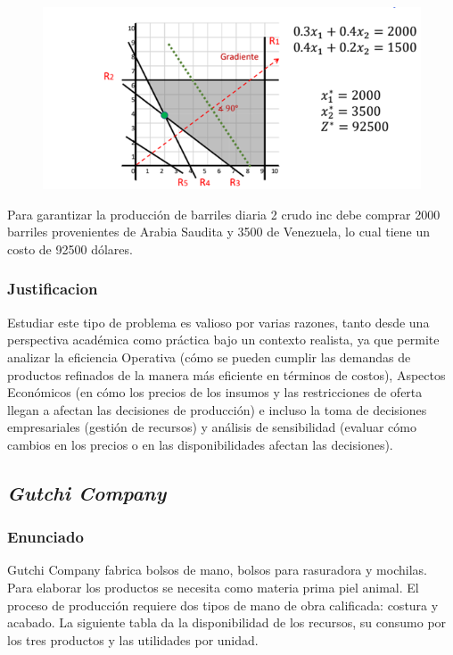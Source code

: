 \documentclass[conference]{IEEEtran}
\begin{document}
\begin{figure}[H]
    \begin{center}
        \includegraphics[width=\linewidth]{./Images/Caso-1_ImagenSolucion.png}
        \caption{}
    \end{center}
\end{figure}

Para garantizar la producción de barriles diaria 2 crudo inc debe comprar
2000 barriles provenientes de Arabia Saudita y 3500 de Venezuela, lo cual
tiene un costo de 92500 dólares.

\subsubsection{Justificacion}

Estudiar este tipo de problema es valioso por varias razones, tanto desde
una perspectiva académica como práctica bajo un contexto realista, ya que
permite analizar la eficiencia Operativa (cómo se pueden cumplir las
demandas de productos refinados de la manera más eficiente en términos
de costos), Aspectos Económicos (en cómo los precios de los insumos y
las restricciones de oferta llegan a afectan las decisiones de producción) e
incluso la toma de decisiones empresariales (gestión de recursos) y
análisis de sensibilidad (evaluar cómo cambios en los precios o en las
disponibilidades afectan las decisiones).

\subsection{\textit{Gutchi Company}}

\subsubsection{Enunciado}

Gutchi Company fabrica bolsos de mano, bolsos para rasuradora y mochilas. Para
elaborar los productos se necesita como materia prima piel animal. El proceso
de producción requiere dos tipos de mano de obra calificada: costura y
acabado. La siguiente tabla da la disponibilidad de los recursos, su
consumo por los tres productos y las utilidades por unidad.
\end{document}
